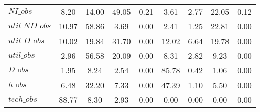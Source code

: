 \begin{center}
\begin{longtable}{lcccccccc}
$NI\_obs        $	 & 	         8.20	 & 	        14.00	 & 	        49.05	 & 	         0.21	 & 	         3.61	 & 	         2.77	 & 	        22.05	 & 	         0.12 \\ 
$util\_ND\_obs  $	 & 	        10.97	 & 	        58.86	 & 	         3.69	 & 	         0.00	 & 	         2.41	 & 	         1.25	 & 	        22.81	 & 	         0.00 \\ 
$util\_D\_obs   $	 & 	        10.02	 & 	        19.84	 & 	        31.70	 & 	         0.00	 & 	        12.02	 & 	         6.64	 & 	        19.78	 & 	         0.00 \\ 
$util\_obs      $	 & 	         2.96	 & 	        56.58	 & 	        20.09	 & 	         0.00	 & 	         8.31	 & 	         2.82	 & 	         9.23	 & 	         0.00 \\ 
$D\_obs         $	 & 	         1.95	 & 	         8.24	 & 	         2.54	 & 	         0.00	 & 	        85.78	 & 	         0.42	 & 	         1.06	 & 	         0.00 \\ 
$h\_obs         $	 & 	         6.48	 & 	        32.20	 & 	         7.33	 & 	         0.00	 & 	        47.39	 & 	         1.10	 & 	         5.50	 & 	         0.00 \\ 
$tech\_obs      $	 & 	        88.77	 & 	         8.30	 & 	         2.93	 & 	         0.00	 & 	         0.00	 & 	         0.00	 & 	         0.00	 & 	         0.00 \\ 
\end{longtable}
 \end{center}
